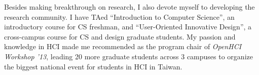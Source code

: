 \noindent
Besides making breakthrough on research, I also devote myself to developing the research community.
I have TAed ``Introduction to Computer Science'', an introductory course for CS freshman, 
and ``User-Oriented Innovative Design'', a cross-campus course for CS and design graduate students.
My passion and knowledge in HCI made me recommended as the program chair of \textit{OpenHCI Workshop '13},
leading 20 more graduate students across 3 campuses to organize the biggest national event for students in HCI in Taiwan. \\



